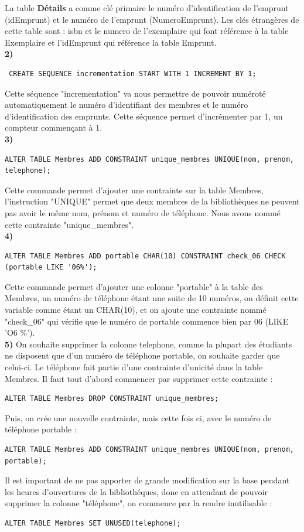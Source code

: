 \documentclass[a4paper,12pt]{article}
\begin{document}
 La table \textbf {Détails} a comme clé primaire le numéro d'identification de l'emprunt (idEmprunt) et le numéro de l'emprunt (NumeroEmprunt). Les clés étrangères de cette table sont : isbn et le numero de l'exemplaire qui font référence à la table Exemplaire et l'idEmprunt qui référence la table Emprunt.\\
 
 
\textbf {2) }
 \begin{lstlisting}
 CREATE SEQUENCE incrementation START WITH 1 INCREMENT BY 1;
 \end{lstlisting}
Cette séquence "incrementation" va nous permettre de pouvoir numéroté automatiquement le numéro d'identifiant des membres et le numéro d'identification des emprunts. Cette séquence permet d'incrémenter par 1, un compteur commençant à 1. \\

\textbf {3) }
 \begin{lstlisting}
ALTER TABLE Membres ADD CONSTRAINT unique_membres UNIQUE(nom, prenom, telephone);
 \end{lstlisting}

Cette commande permet d'ajouter une contrainte sur la table Membres, l'instruction "UNIQUE" permet que deux membres de la bibliothèques ne peuvent pas avoir le même nom, prénom et numéro de téléphone. Nous avons nommé cette contrainte "unique\_membres".\\

\textbf {4) }
 \begin{lstlisting}
ALTER TABLE Membres ADD portable CHAR(10) CONSTRAINT check_06 CHECK (portable LIKE '06%');
  \end{lstlisting}

Cette commande permet d'ajouter une colonne "portable" à la table des Membres, un numéro de téléphone étant une suite de 10 numéros, on définit cette variable comme étant un CHAR(10), et on ajoute une contrainte nommé "check\_06" qui vérifie que le numéro de portable commence bien par 06 (LIKE 'O6 \%').\\

\textbf {5) } On souhaite supprimer la colonne telephone, comme la plupart des étudiants ne disposent que d'un numéro de téléphone portable, on souhaite garder que celui-ci. Le téléphone fait partie d'une contrainte d'unicité dans la table Membres. Il faut tout d'abord commencer par supprimer cette contrainte : 
 \begin{lstlisting}
ALTER TABLE Membres DROP CONSTRAINT unique_membres;
\end{lstlisting}
Puis, on crée une nouvelle contrainte, mais cette fois ci, avec le numéro de téléphone portable : 
 \begin{lstlisting}
ALTER TABLE Membres ADD CONSTRAINT unique_membres UNIQUE(nom, prenom, portable); 
\end{lstlisting}
Il est important de ne pas apporter de grande modification sur la base pendant les heures d'ouvertures de la bibliothéques, donc en attendant de pouvoir supprimer la colonne "téléphone", on commence par la rendre inutilisable :
 \begin{lstlisting}
ALTER TABLE Membres SET UNUSED(telephone);
\end{lstlisting}
\end{document}
